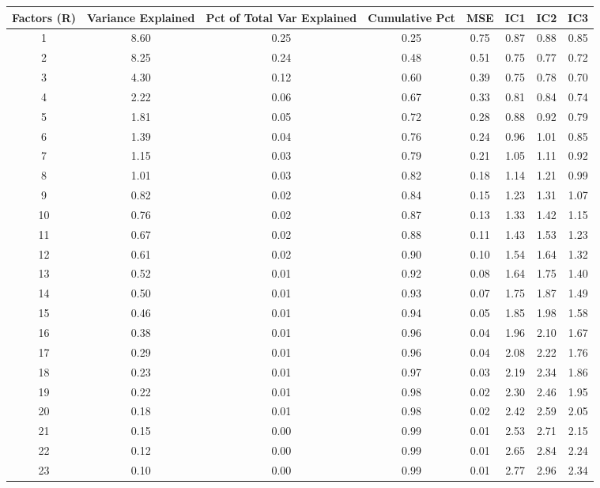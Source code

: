\documentclass[11pt, letterpaper]{article}\usepackage[]{graphicx}\usepackage[]{color}
\begin{document}
\begin{table}[H]
\centering
\begingroup\scriptsize
\begin{tabular}{cccccccc}
  \hline
Factors (R) & Variance Explained & Pct of Total Var Explained & Cumulative Pct & MSE & IC1 & IC2 & IC3 \\ 
  \hline
  1 & 8.60 & 0.25 & 0.25 & 0.75 & 0.87 & 0.88 & 0.85 \\ 
    2 & 8.25 & 0.24 & 0.48 & 0.51 & 0.75 & 0.77 & 0.72 \\ 
    3 & 4.30 & 0.12 & 0.60 & 0.39 & 0.75 & 0.78 & 0.70 \\ 
    4 & 2.22 & 0.06 & 0.67 & 0.33 & 0.81 & 0.84 & 0.74 \\ 
    5 & 1.81 & 0.05 & 0.72 & 0.28 & 0.88 & 0.92 & 0.79 \\ 
    6 & 1.39 & 0.04 & 0.76 & 0.24 & 0.96 & 1.01 & 0.85 \\ 
    7 & 1.15 & 0.03 & 0.79 & 0.21 & 1.05 & 1.11 & 0.92 \\ 
    8 & 1.01 & 0.03 & 0.82 & 0.18 & 1.14 & 1.21 & 0.99 \\ 
    9 & 0.82 & 0.02 & 0.84 & 0.15 & 1.23 & 1.31 & 1.07 \\ 
   10 & 0.76 & 0.02 & 0.87 & 0.13 & 1.33 & 1.42 & 1.15 \\ 
   11 & 0.67 & 0.02 & 0.88 & 0.11 & 1.43 & 1.53 & 1.23 \\ 
   12 & 0.61 & 0.02 & 0.90 & 0.10 & 1.54 & 1.64 & 1.32 \\ 
   13 & 0.52 & 0.01 & 0.92 & 0.08 & 1.64 & 1.75 & 1.40 \\ 
   14 & 0.50 & 0.01 & 0.93 & 0.07 & 1.75 & 1.87 & 1.49 \\ 
   15 & 0.46 & 0.01 & 0.94 & 0.05 & 1.85 & 1.98 & 1.58 \\ 
   16 & 0.38 & 0.01 & 0.96 & 0.04 & 1.96 & 2.10 & 1.67 \\ 
   17 & 0.29 & 0.01 & 0.96 & 0.04 & 2.08 & 2.22 & 1.76 \\ 
   18 & 0.23 & 0.01 & 0.97 & 0.03 & 2.19 & 2.34 & 1.86 \\ 
   19 & 0.22 & 0.01 & 0.98 & 0.02 & 2.30 & 2.46 & 1.95 \\ 
   20 & 0.18 & 0.01 & 0.98 & 0.02 & 2.42 & 2.59 & 2.05 \\ 
   21 & 0.15 & 0.00 & 0.99 & 0.01 & 2.53 & 2.71 & 2.15 \\ 
   22 & 0.12 & 0.00 & 0.99 & 0.01 & 2.65 & 2.84 & 2.24 \\ 
   23 & 0.10 & 0.00 & 0.99 & 0.01 & 2.77 & 2.96 & 2.34 \\ 

\end{tabular}
\end{table}
\end{document}
